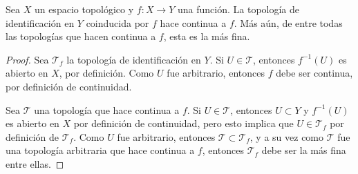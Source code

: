 
\begin{proposition}
Sea $X$ un espacio topológico y $f : X \longrightarrow Y$ una función. La topología de identificación en $Y$ coinducida por $f$ hace continua a $f$. Más aún, de entre todas las topologías que hacen continua a $f$, esta es la más fina.
\end{proposition}

\begin{proof}
Sea $\mathcal{T}_f$ la topología de identificación en $Y$. Si $U \in \mathcal{T}$, entonces $f^{-1}(U)$ es abierto en $X$, por definición. Como $U$ fue arbitrario, entonces $f$ debe ser continua, por definición de continuidad.
\bigskip

Sea $\mathcal{T}$ una topología que hace continua a $f$. Si $U \in \mathcal{T}$, entonces $U \subset Y$ y $f^{-1}(U)$ es abierto en $X$ por definición de continuidad, pero esto implica que $U \in \mathcal{T}_f$ por definición de $\mathcal{T}_f$. Como $U$ fue arbitrario, entonces $\mathcal{T} \subset \mathcal{T}_f$, y a su vez como $\mathcal{T}$ fue una topología arbitraria que hace continua a $f$, entonces $\mathcal{T}_f$ debe ser la más fina entre ellas.
\end{proof}
